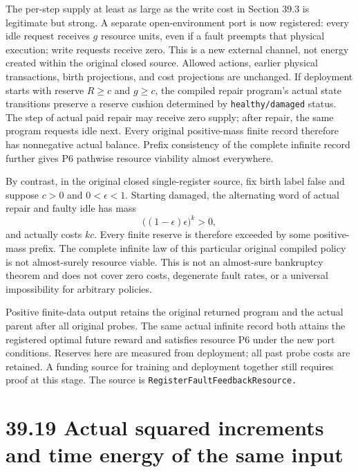 \documentclass[
  english,
  11pt,
  oneside]{book}
\begin{document}
The per-step supply at least as large as the write cost in Section 39.3 is legitimate but strong. A separate open-environment port is now registered: every idle request receives \(g\) resource units, even if a fault preempts that physical execution; write requests receive zero. This is a new external channel, not energy created within the original closed source. Allowed actions, earlier physical transactions, birth projections, and cost projections are unchanged. If deployment starts with reserve \(R\ge c\) and \(g\ge c\), the compiled repair program's actual state transitions preserve a reserve cushion determined by \nolinkurl{healthy/damaged} status. The step of actual paid repair may receive zero supply; after repair, the same program requests idle next. Every original positive-mass finite record therefore has nonnegative actual balance. Prefix consistency of the complete infinite record further gives P6 pathwise resource viability almost everywhere.

By contrast, in the original closed single-register source, fix birth label false and suppose \(c>0\) and \(0<\epsilon<1\). Starting damaged, the alternating word of actual repair and faulty idle has mass \[\bigl((1-\epsilon)\epsilon\bigr)^k>0,\] and actually costs \(kc\). Every finite reserve is therefore exceeded by some positive-mass prefix. The complete infinite law of this particular original compiled policy is not almost-surely resource viable. This is not an almost-sure bankruptcy theorem and does not cover zero costs, degenerate fault rates, or a universal impossibility for arbitrary policies.

Positive finite-data output retains the original returned program and the actual parent after all original probes. The same actual infinite record both attains the registered optimal future reward and satisfies resource P6 under the new port conditions. Reserves here are measured from deployment; all past probe costs are retained. A funding source for training and deployment together still requires proof at this stage. The source is \nolinkurl{RegisterFaultFeedbackResource.}

\section{39.19 Actual squared increments and time energy of the same input}\label{actual-squared-increments-and-time-energy-of-the-same-input}
\end{document}
